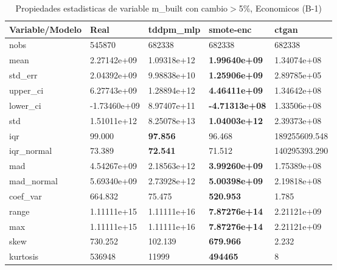 \begin{table}[H]
\centering
\fontsize{8}{14}\selectfont
\caption{Propiedades estadisticas de variable m\_built con cambio\ensuremath{>}5\%, Economicos (B-1)}
\label{table-stats-economicos-b-1-m_built-short}
\begin{tabular}{|l|m{10em}|m{10em}|m{10em}|m{10em}|}
\hline
 \rowcolor[gray]{0.8}
Variable/Modelo & Real & tddpm\_mlp & smote-enc & ctgan \\
\hline nobs & 545870 & 682338 & 682338 & 682338 \\
\hline mean & 2.27142e+09 & \cellcolor[rgb]{0.9, 0.54, 0.52} 1.09318e+12 & \bfseries 1.99640e+09 & 1.34074e+08 \\
\hline std\_err & 2.04392e+09 & \cellcolor[rgb]{0.9, 0.54, 0.52} 9.98838e+10 & \bfseries 1.25906e+09 & 2.89785e+05 \\
\hline upper\_ci & 6.27743e+09 & \cellcolor[rgb]{0.9, 0.54, 0.52} 1.28894e+12 & \bfseries 4.46411e+09 & 1.34642e+08 \\
\hline lower\_ci & -1.73460e+09 & \cellcolor[rgb]{0.9, 0.54, 0.52} 8.97407e+11 & \bfseries -4.71313e+08 & 1.33506e+08 \\
\hline std & 1.51011e+12 & \cellcolor[rgb]{0.9, 0.54, 0.52} 8.25078e+13 & \bfseries 1.04003e+12 & 2.39373e+08 \\
\hline iqr & 99.000 & \bfseries 97.856 & 96.468 & \cellcolor[rgb]{0.9, 0.54, 0.52} 189255609.548 \\
\hline iqr\_normal & 73.389 & \bfseries 72.541 & 71.512 & \cellcolor[rgb]{0.9, 0.54, 0.52} 140295393.290 \\
\hline mad & 4.54267e+09 & \cellcolor[rgb]{0.9, 0.54, 0.52} 2.18563e+12 & \bfseries 3.99260e+09 & 1.75389e+08 \\
\hline mad\_normal & 5.69340e+09 & \cellcolor[rgb]{0.9, 0.54, 0.52} 2.73928e+12 & \bfseries 5.00398e+09 & 2.19818e+08 \\
\hline coef\_var & 664.832 & 75.475 & \bfseries 520.953 & \cellcolor[rgb]{0.9, 0.54, 0.52} 1.785 \\
\hline range & 1.11111e+15 & \cellcolor[rgb]{0.9, 0.54, 0.52} 1.11111e+16 & \bfseries 7.87276e+14 & 2.21121e+09 \\
\hline max & 1.11111e+15 & \cellcolor[rgb]{0.9, 0.54, 0.52} 1.11111e+16 & \bfseries 7.87276e+14 & 2.21121e+09 \\
\hline skew & 730.252 & 102.139 & \bfseries 679.966 & \cellcolor[rgb]{0.9, 0.54, 0.52} 2.232 \\
\hline kurtosis & 536948 & 11999 & \bfseries 494465 & \cellcolor[rgb]{0.9, 0.54, 0.52} 8 \\

\end{tabular}
\end{table}
